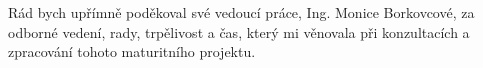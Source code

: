 \newpage
\thispagestyle{empty}
\noindent
Rád bych upřímně poděkoval své vedoucí práce, Ing. Monice Borkovcové,
za odborné vedení, rady, trpělivost a čas, který mi věnovala
při konzultacích a zpracování tohoto maturitního projektu.